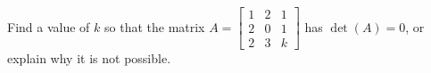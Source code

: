 Find a value of $k$ so that the matrix 
$A = \begin{bmatrix} 
1 & 2 & 1\\
2 & 0 & 1 \\
2 & 3 & k
\end{bmatrix}$ 
has $\det(A) = 0$, or explain why it is not possible.